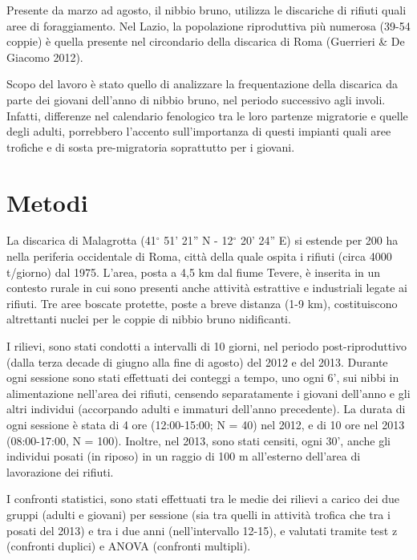 Presente da marzo ad agosto, il nibbio bruno, utilizza le discariche di
rifiuti quali aree di foraggiamento. Nel Lazio, la popolazione
riproduttiva pi\`u numerosa (39-54 coppie) \`e quella presente nel
circondario della discarica di Roma (Guerrieri \& De Giacomo 2012).

Scopo del lavoro \`e stato quello di analizzare la frequentazione della
discarica da parte dei giovani dell{\textquoteright}anno di nibbio
bruno, nel periodo successivo agli involi. Infatti, differenze nel
calendario fenologico tra le loro partenze migratorie e quelle degli
adulti, porrebbero l{\textquoteright}accento
sull{\textquoteright}importanza di questi impianti quali aree trofiche
e di sosta pre-migratoria soprattutto per i giovani.

\section*{Metodi}

La discarica di Malagrotta (41$^\circ$ 51'
21'' N - 12$^\circ$
20'  24''  E) si
estende per 200 ha nella periferia occidentale di Roma, citt\`a della
quale ospita i rifiuti (circa 4000 t/giorno) dal
1975. L{\textquoteright}area, posta a 4,5 km dal fiume Tevere, \`e
inserita in un contesto rurale in cui sono presenti anche attivit\`a
estrattive e industriali legate ai rifiuti. Tre aree boscate protette,
poste a breve distanza (1-9 km), costituiscono altrettanti nuclei per
le coppie di nibbio bruno nidificanti.

I rilievi, sono stati condotti a intervalli di 10 giorni, nel periodo
post-riproduttivo (dalla terza decade di giugno alla fine di agosto)
del 2012 e del 2013. Durante ogni se\allowbreak \allowbreak ssione sono stati effettuati
dei conteggi a tempo, uno ogni 6', sui nibbi in
alimentazione nell{\textquoteright}area dei rifiuti, censendo
separatamente i giovani dell{\textquoteright}anno e gli altri individui
(accorpando adulti e immaturi dell{\textquoteright}anno precedente). La
durata di ogni sessione \`e stata di 4 ore (12:00-15:00; N = 40) nel
2012, e di 10 ore nel 2013 (08:00-17:00, N = 100). Inoltre, nel 2013,
sono stati censiti, ogni 30', anche gli individui
posati (in riposo) in un raggio di 100 m all{\textquoteright}esterno
dell{\textquoteright}area di lavorazione dei rifiuti.

I confronti statistici, sono stati effettuati tra le medie dei rilievi a
carico dei due gruppi (adulti e giovani) per sessione (sia tra quelli
in attivit\`a trofica che tra i posati del 2013) e tra i due anni
(nell{\textquoteright}intervallo 12-15), e valutati tramite test z
(confronti duplici) e ANOVA (confronti multipli). 

